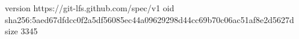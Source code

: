 version https://git-lfs.github.com/spec/v1
oid sha256:5aed67dfdcc0f2a5df56085ec44a09629298d44cc69b70c06ac51af8e2d5627d
size 3345

